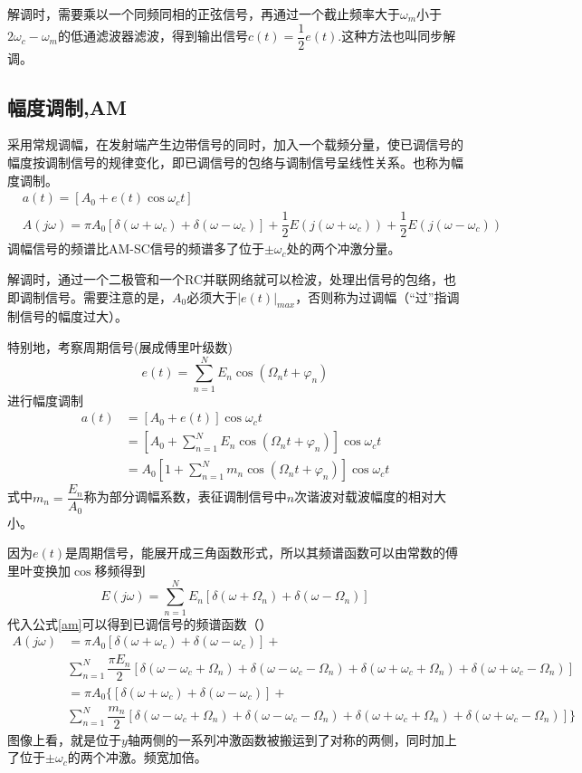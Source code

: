 解调时，需要乘以一个同频同相的正弦信号，再通过一个截止频率大于$\omega_m$小于$2\omega_c - \omega_m$的低通滤波器滤波，得到输出信号$c(t)=\dfrac{1}{2}e(t)$.这种方法也叫同步解调。
\subsection{幅度调制,AM}
采用常规调幅，在发射端产生边带信号的同时，加入一个载频分量，使已调信号的幅度按调制信号的规律变化，即已调信号的包络与调制信号呈线性关系。也称为幅度调制。
\begin{align}
    &a(t)=[A_0+e(t)\cos \omega_c t]\\
    &A(j\omega)=\pi A_0[\delta(\omega+\omega_c)+\delta(\omega-\omega_c)]+\dfrac{1}{2}E(j(\omega+\omega_c))+\dfrac{1}{2}E(j(\omega-\omega_c))
    \label{am}
\end{align}
调幅信号的频谱比AM-SC信号的频谱多了位于$\pm \omega_c$处的两个冲激分量。

解调时，通过一个二极管和一个RC并联网络就可以检波，处理出信号的包络，也即调制信号。需要注意的是，$A_0$必须大于$|e(t)|_{max}$，否则称为过调幅（“过”指调制信号的幅度过大）。

特别地，考察周期信号(展成傅里叶级数)
\begin{equation}
    e(t)=\sum_{n=1}^{N}E_{n}\cos (\Omega_n t +\varphi_n)
\end{equation}
进行幅度调制
\begin{align}
    a(t)&=[A_0+e(t)]\cos \omega_c t\\
    &=\left[ A_0 + \sum_{n=1}^{N}E_{n}\cos (\Omega_n t +\varphi_n)\right] \cos \omega_c t\\
    &=A_0\left[1+ \sum_{n=1}^{N}m_{n}\cos (\Omega_n t +\varphi_n) \right]\cos \omega_c t
\end{align}
式中$m_n=\dfrac{E_n}{A_0}$称为部分调幅系数，表征调制信号中$n$次谐波对载波幅度的相对大小。

因为$e(t)$是周期信号，能展开成三角函数形式，所以其频谱函数可以由常数的傅里叶变换加$\cos$移频得到
\begin{equation}
    E(j\omega)=\sum_{n=1}^{N}E_{n}[\delta(\omega+\Omega_n)+\delta(\omega-\Omega_n)]
\end{equation}
代入公式\ref{am}可以得到已调信号的频谱函数（{\color{red}{假设$\varphi_n=0$}}）
\begin{align}
    A(j\omega)&=\pi A_0[\delta(\omega+\omega_c)+\delta(\omega-\omega_c)] + \\
    &\sum_{n=1}^{N}\dfrac{\pi E_n}{2}[\delta(\omega-\omega_c+\Omega_n)+\delta(\omega-\omega_c-\Omega_n)+\delta(\omega+\omega_c+\Omega_n)+\delta(\omega+\omega_c-\Omega_n)]\\
    &=\pi A_0\{ [\delta(\omega+\omega_c)+\delta(\omega-\omega_c)] + \\
    &\sum_{n=1}^{N}\dfrac{m_n}{2}[\delta(\omega-\omega_c+\Omega_n)+\delta(\omega-\omega_c-\Omega_n)+\delta(\omega+\omega_c+\Omega_n)+\delta(\omega+\omega_c-\Omega_n)]\}
\end{align}
图像上看，就是位于$y$轴两侧的一系列冲激函数被搬运到了对称的两侧，同时加上了位于$\pm \omega_c$的两个冲激。频宽加倍。


